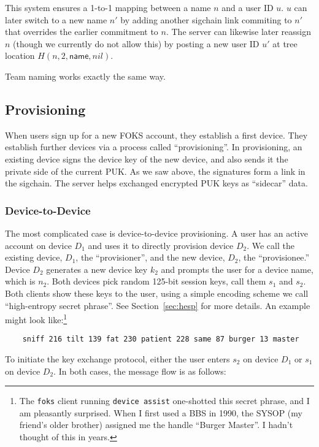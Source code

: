 This system ensures a 1-to-1 mapping between a name $n$ and a
user ID $u$. $u$ can later switch to a new name $n'$ by adding
another sigchain link commiting to $n'$ that overrides the earlier
commitment to $n$. The server can likewise later reassign $n$
(though we currently do not allow this) by posting a new user ID
$u'$ at tree location $H(n, 2, \textsf{name}, nil)$.

Team naming works exactly the same way.

\subsection{Provisioning}

When users sign up for a new FOKS account, they establish a first device. They
establish further devices via a process called ``provisioning''. In
provisioning, an existing device signs the device key of the new device, and
also sends it the private side of the current PUK. As we saw above, the
signatures form a link in the sigchain. The server helps exchanged encrypted PUK
keys as ``sidecar'' data.

\subsubsection{Device-to-Device}
\label{sec:kex}

The most complicated case is device-to-device provisioning. A user has an
active account on device $D_1$ and uses it to directly provision device $D_2$.
We call the existing device, $D_1$, the ``provisioner'', and the new device, $D_2$,
the ``provisionee.''
Device $D_2$ generates a new device key $k_2$ and prompts the user for
a device name, which is $n_2$.
Both devices pick random 125-bit session keys, call them $s_1$ and $s_2$. Both clients
show these keys to the user, using a simple encoding scheme we call
``high-entropy secret phrase''. See Section~\ref{sec:hesp} for more details.
An example might look like:\footnote{The \texttt{foks} client
running \texttt{device assist} one-shotted this secret phrase, and I am pleasantly surprised.
When I first used a BBS in 1990, the SYSOP (my friend's older brother) assigned me the 
handle ``Burger Master''. I hadn't thought of this in years.}

\begin{verbatim}
    sniff 216 tilt 139 fat 230 patient 228 same 87 burger 13 master
\end{verbatim}

To initiate the key exchange protocol, either the user enters $s_2$ on device $D_1$
or $s_1$ on device $D_2$. In both cases, the message flow is as follows:

